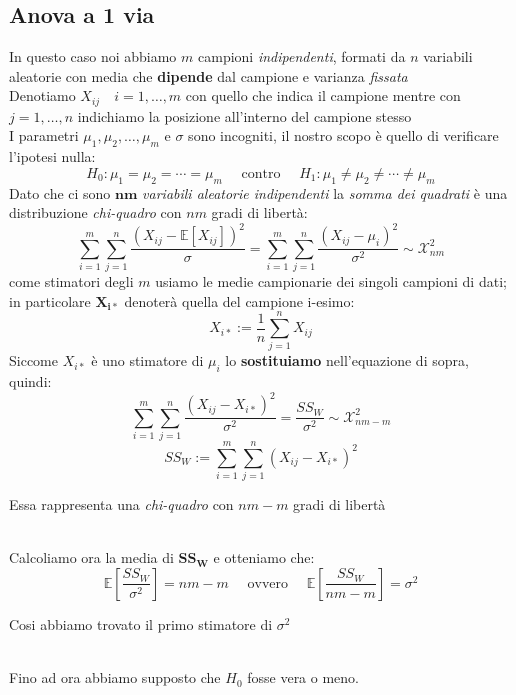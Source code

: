 \documentclass[]{article}
\newcommand{\ev}{\mathbb{E}[X]}
\renewcommand{\ev}[1]{\mathbb{E}\left[#1\right]}
\begin{document}
    \subsection{Anova a 1 via}
    In questo caso noi abbiamo $m$ campioni \textit{indipendenti}, formati da $n$ variabili aleatorie con media che \textbf{dipende} dal campione e varianza \textit{fissata} \\
    Denotiamo $X_{ij} \quad i = 1,\ldots, m$ con quello che indica il campione mentre con $j=1, \ldots, n$ indichiamo la posizione all'interno del campione stesso \\[2ex] 
    I parametri $\mu_1, \mu_2, \ldots, \mu_m$ e $\sigma$ sono incogniti, il nostro scopo è quello di verificare l'ipotesi nulla:
    \[ H_0 : \mu_1 = \mu_2 = \cdots = \mu_m \quad \text{ contro } \quad H_1 : \mu_1 \not= \mu_2 \not= \cdots \not= \mu_m \]
    Dato che ci sono $\boldsymbol{nm}$ \textit{variabili aleatorie indipendenti} la \textit{somma dei quadrati} è una distribuzione \textit{chi-quadro} con $nm$ gradi di libertà:
    \[ \sum_{i=1}^{m} \sum_{j=1}^{n} \frac{(X_{ij} - \ev{X_{ij}})^2}{\sigma} = \sum_{i=1}^{m} \sum_{j=1}^{n} \frac{(X_{ij} - \mu_i)^2}{\sigma^2} \sim \mathcal{X}^2_{nm} \]
    come stimatori degli $m$ usiamo le medie campionarie dei singoli campioni di dati; in particolare $\boldsymbol{X_{i*}}$ denoterà quella del campione i-esimo:
    \[ X_{i*} := \frac{1}{n} \sum_{j=1}^{n} X_{ij} \]
    Siccome $X_{i*}$ è uno stimatore di $\mu_i$ lo \textbf{sostituiamo} nell'equazione di sopra, quindi:
    \[ \sum_{i=1}^{m} \sum_{j=1}^{n} \frac{(X_{ij} - X_{i*})^2}{\sigma^2} = \frac{SS_W}{\sigma^2} \sim \mathcal{X}^2_{nm - m} \]
    $$ SS_W := \sum_{i=1}^m\sum_{j=1}^n(X_{ij}-X_{i*})^2 $$
    \centerline{Essa rappresenta una \textit{chi-quadro} con $nm-m$ gradi di libertà} \\[2ex]
    Calcoliamo ora la media di $\boldsymbol{SS_W}$ e otteniamo che:\
    \[ \ev{\frac{SS_W}{\sigma^2}} = nm - m \quad \text{ ovvero } \quad \ev{\frac{SS_W}{nm-m}} = \sigma^2 \]
    \centerline{Cosi abbiamo trovato il primo stimatore di $\sigma^2$} \\[2ex]
    Fino ad ora abbiamo supposto che $H_0$ fosse vera o meno.
\end{document}
